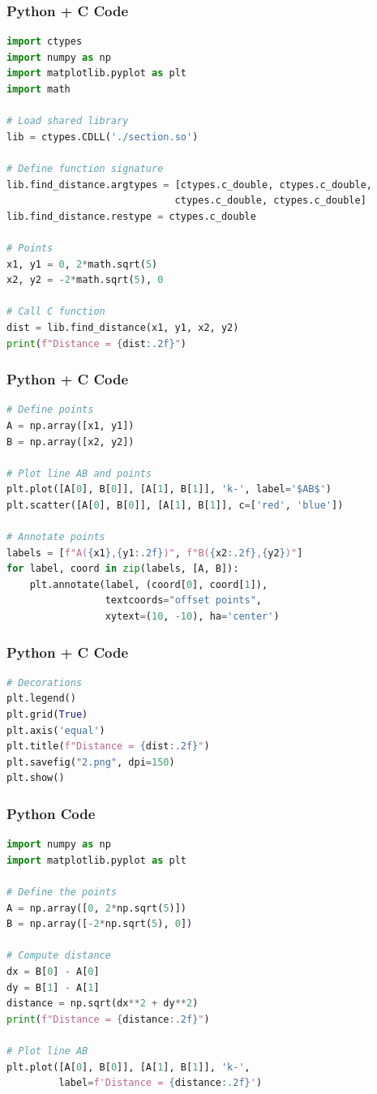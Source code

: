 \documentclass{beamer}
\begin{document}
\begin{frame}[fragile]
    \frametitle{Python + C Code}
    \begin{lstlisting}[language=Python]
import ctypes
import numpy as np
import matplotlib.pyplot as plt
import math

# Load shared library
lib = ctypes.CDLL('./section.so')

# Define function signature
lib.find_distance.argtypes = [ctypes.c_double, ctypes.c_double,
                             ctypes.c_double, ctypes.c_double]
lib.find_distance.restype = ctypes.c_double

# Points
x1, y1 = 0, 2*math.sqrt(5)
x2, y2 = -2*math.sqrt(5), 0

# Call C function
dist = lib.find_distance(x1, y1, x2, y2)
print(f"Distance = {dist:.2f}")
    \end{lstlisting}
\end{frame}

\begin{frame}[fragile]
    \frametitle{Python + C Code}
    \begin{lstlisting}[language=Python]
# Define points
A = np.array([x1, y1])
B = np.array([x2, y2])

# Plot line AB and points
plt.plot([A[0], B[0]], [A[1], B[1]], 'k-', label='$AB$')
plt.scatter([A[0], B[0]], [A[1], B[1]], c=['red', 'blue'])

# Annotate points
labels = [f"A({x1},{y1:.2f})", f"B({x2:.2f},{y2})"]
for label, coord in zip(labels, [A, B]):
    plt.annotate(label, (coord[0], coord[1]),
                 textcoords="offset points",
                 xytext=(10, -10), ha='center')

    \end{lstlisting}
\end{frame}

\begin{frame}[fragile]
    \frametitle{Python + C Code}
    \begin{lstlisting}[language=Python]
# Decorations
plt.legend()
plt.grid(True)
plt.axis('equal')
plt.title(f"Distance = {dist:.2f}")
plt.savefig("2.png", dpi=150)
plt.show()
    \end{lstlisting}
\end{frame}

\begin{frame}[fragile]
    \frametitle{Python Code}
    \begin{lstlisting}[language=Python]
import numpy as np
import matplotlib.pyplot as plt

# Define the points
A = np.array([0, 2*np.sqrt(5)])
B = np.array([-2*np.sqrt(5), 0])

# Compute distance
dx = B[0] - A[0]
dy = B[1] - A[1]
distance = np.sqrt(dx**2 + dy**2)
print(f"Distance = {distance:.2f}")

# Plot line AB
plt.plot([A[0], B[0]], [A[1], B[1]], 'k-',
         label=f'Distance = {distance:.2f}')
    \end{lstlisting}
\end{frame}
\end{document}
